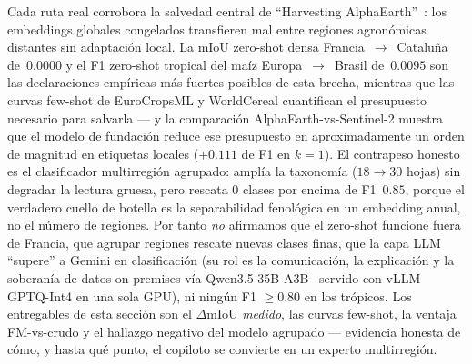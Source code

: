 Cada ruta real corrobora la salvedad central de ``Harvesting
AlphaEarth''~\cite{harvesting2026alphaearth}: los embeddings globales
congelados transfieren mal entre regiones agronómicas distantes sin
adaptación local. La mIoU zero-shot densa
Francia~$\rightarrow$~Cataluña de~$0.0000$ y el F1 zero-shot tropical del
maíz Europa~$\rightarrow$~Brasil de~$0.0095$ son las declaraciones
empíricas más fuertes posibles de esta brecha, mientras que las curvas
few-shot de EuroCropsML y WorldCereal cuantifican el presupuesto
necesario para salvarla --- y la comparación AlphaEarth-vs-Sentinel-2
muestra que el modelo de fundación reduce ese presupuesto en
aproximadamente un orden de magnitud en etiquetas locales ($+0.111$ de F1
en $k{=}1$). El contrapeso honesto es el clasificador multirregión
agrupado: amplía la taxonomía ($18\rightarrow30$ hojas) sin degradar la
lectura gruesa, pero rescata $0$ clases por encima de F1~$0.85$, porque
el verdadero cuello de botella es la separabilidad fenológica en un
embedding anual, no el número de regiones. Por tanto \emph{no} afirmamos
que el zero-shot funcione fuera de Francia, que agrupar regiones rescate
nuevas clases finas, que la capa LLM ``supere'' a Gemini en
clasificación (su rol es la comunicación, la explicación y la soberanía
de datos on-premises vía Qwen3.5-35B-A3B~\cite{yang2025qwen3} servido con
vLLM GPTQ-Int4 en una sola GPU), ni ningún F1 $\geq$0.80 en los
trópicos. Los entregables de esta sección son el $\Delta$mIoU
\emph{medido}, las curvas few-shot, la ventaja FM-vs-crudo y el hallazgo
negativo del modelo agrupado --- evidencia honesta de cómo, y hasta qué
punto, el copiloto se convierte en un experto multirregión.

